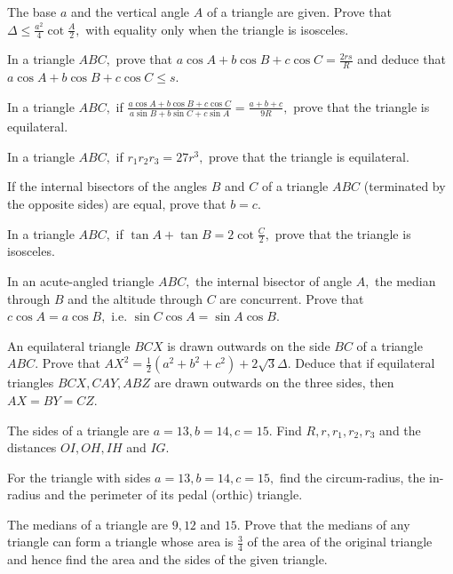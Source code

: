\item The base $a$ and the vertical angle $A$ of a triangle are given. Prove that $\Delta\leq \frac{a^2}{4}\cot\frac{A}{2},$
   with equality only when the triangle is isosceles.

\item In a triangle $ABC,$ prove that $a\cos A + b\cos B + c\cos C = \frac{2rs}{R}$ and deduce that $a\cos A + b\cos B +
   c\cos C\leq s.$

\item In a triangle $ABC,$ if $\frac{a\cos A + b\cos B + c\cos C}{a\sin B + b\sin C + c\sin A} = \frac{a + b + c}{9R},$ prove
   that the triangle is equilateral.

\item In a triangle $ABC,$ if $r_1r_2r_3 = 27r^3,$ prove that the triangle is equilateral.

\item If the internal bisectors of the angles $B$ and $C$ of a triangle $ABC$ (terminated by the opposite sides) are equal,
   prove that $b = c.$

\item In a triangle $ABC,$ if $\tan A + \tan B = 2\cot\frac{C}{2},$ prove that the triangle is isosceles.

\item In an acute-angled triangle $ABC,$ the internal bisector of angle $A,$ the median through $B$ and the altitude through $C$
   are concurrent. Prove that $c\cos A = a\cos B,$ i.e. $\sin C\cos A = \sin A\cos B.$

\item An equilateral triangle $BCX$ is drawn outwards on the side $BC$ of a triangle $ABC.$ Prove that $AX^2 = \frac{1}{2}(a^2 +
   b^2 + c^2) + 2\sqrt{3}\Delta.$ Deduce that if equilateral triangles $BCX, CAY, ABZ$ are drawn outwards on the three sides,
   then $AX = BY = CZ.$

\item The sides of a triangle are $a = 13, b = 14, c = 15.$ Find $R, r, r_1, r_2, r_3$ and the distances $OI, OH, IH$ and $IG.$

\item For the triangle with sides $a = 13, b = 14, c = 15,$ find the circum-radius, the in-radius and the perimeter of its
   pedal (orthic) triangle.

\item The medians of a triangle are $9, 12$ and $15.$ Prove that the medians of any triangle can form a triangle whose area
   is $\frac{3}{4}$ of the area of the original triangle and hence find the area and the sides of the given triangle.

